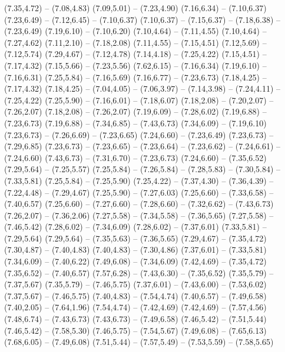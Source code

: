 {  (7.35,4.72) -- (7.08,4.83)
  (7.09,5.01) -- (7.23,4.90)
  (7.16,6.34) -- (7.10,6.37)
  (7.23,6.49) -- (7.12,6.45) -- (7.10,6.37)
  (7.10,6.37) -- (7.15,6.37) -- (7.18,6.38) -- (7.23,6.49)
  (7.19,6.10) -- (7.10,6.20)
  (7.10,4.64) -- (7.11,4.55)
  (7.10,4.64) -- (7.27,4.62)
  (7.11,2.10) -- (7.18,2.08)
  (7.11,4.55) -- (7.15,4.51)
  (7.12,5.69) -- (7.12,5.74)
  (7.29,4.67) -- (7.12,4.78)
  (7.14,4.18) -- (7.25,4.22)
  (7.15,4.51) -- (7.17,4.32)
  (7.15,5.66) -- (7.23,5.56)
  (7.62,6.15) -- (7.16,6.34)
  (7.19,6.10) -- (7.16,6.31)
  (7.25,5.84) -- (7.16,5.69)
  (7.16,6.77) -- (7.23,6.73)
  (7.18,4.25) -- (7.17,4.32)
  (7.18,4.25) -- (7.04,4.05) -- (7.06,3.97) -- (7.14,3.98) -- (7.24,4.11) -- (7.25,4.22)
  (7.25,5.90) -- (7.16,6.01) -- (7.18,6.07)
  (7.18,2.08) -- (7.20,2.07) -- (7.26,2.07)
  (7.18,2.08) -- (7.26,2.07)
  (7.19,6.09) -- (7.28,6.02)
  (7.19,6.88) -- (7.23,6.73)
  (7.19,6.88) -- (7.34,6.85) -- (7.43,6.73)
  (7.34,6.09) -- (7.19,6.10)
  (7.23,6.73) -- (7.26,6.69) -- (7.23,6.65)
  (7.24,6.60) -- (7.23,6.49)
  (7.23,6.73) -- (7.29,6.85)
  (7.23,6.73) -- (7.23,6.65) -- (7.23,6.64) -- (7.23,6.62) -- (7.24,6.61) -- (7.24,6.60)
  (7.43,6.73) -- (7.31,6.70) -- (7.23,6.73)
  (7.24,6.60) -- (7.35,6.52)
  (7.29,5.64) -- (7.25,5.57)
  (7.25,5.84) -- (7.26,5.84) -- (7.28,5.83) -- (7.30,5.84) -- (7.33,5.81)
  (7.25,5.84) -- (7.25,5.90)
  (7.25,4.22) -- (7.37,4.30) -- (7.36,4.39) -- (7.22,4.48) -- (7.29,4.67)
  (7.25,5.90) -- (7.27,6.03)
  (7.25,6.60) -- (7.33,6.58) -- (7.40,6.57)
  (7.25,6.60) -- (7.27,6.60) -- (7.28,6.60) -- (7.32,6.62) -- (7.43,6.73)
  (7.26,2.07) -- (7.36,2.06)
  (7.27,5.58) -- (7.34,5.58) -- (7.36,5.65)
  (7.27,5.58) -- (7.46,5.42)
  (7.28,6.02) -- (7.34,6.09)
  (7.28,6.02) -- (7.37,6.01)
  (7.33,5.81) -- (7.29,5.64)
  (7.29,5.64) -- (7.35,5.63) -- (7.36,5.65)
  (7.29,4.67) -- (7.35,4.72)
  (7.30,4.87) -- (7.40,4.83)
  (7.40,4.83) -- (7.30,4.86)
  (7.37,6.01) -- (7.33,5.81)
  (7.34,6.09) -- (7.40,6.22)
  (7.49,6.08) -- (7.34,6.09)
  (7.42,4.69) -- (7.35,4.72)
  (7.35,6.52) -- (7.40,6.57)
  (7.57,6.28) -- (7.43,6.30) -- (7.35,6.52)
  (7.35,5.79) -- (7.37,5.67)
  (7.35,5.79) -- (7.46,5.75)
  (7.37,6.01) -- (7.43,6.00) -- (7.53,6.02)
  (7.37,5.67) -- (7.46,5.75)
  (7.40,4.83) -- (7.54,4.74)
  (7.40,6.57) -- (7.49,6.58)
  (7.40,2.05) -- (7.64,1.96)
  (7.54,4.74) -- (7.42,4.69)
  (7.42,4.69) -- (7.57,4.56)
  (7.48,6.74) -- (7.43,6.73)
  (7.43,6.73) -- (7.49,6.58)
  (7.46,5.42) -- (7.51,5.44)
  (7.46,5.42) -- (7.58,5.30)
  (7.46,5.75) -- (7.54,5.67)
  (7.49,6.08) -- (7.65,6.13)
  (7.68,6.05) -- (7.49,6.08)
  (7.51,5.44) -- (7.57,5.49) -- (7.53,5.59) -- (7.58,5.65)
}
